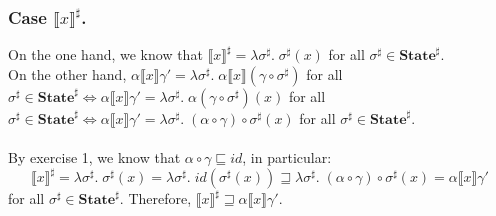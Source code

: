 \documentclass{article}
\newcommand{\sem}[1]{\llbracket #1 \rrbracket}
\newcommand{\state}{\textbf{State}}
\newcommand{\sgs}{\sigma^{\sharp}}
\newcommand{\ssx}[1]{\sem{#1}^{\sharp}}
\begin{document}
\subsubsection*{Case $\ssx{x}$.}
On the one hand, we know that $\ssx{x} = \lambda \sgs. \; \sgs(x)$ for all $\sgs \in \state^{\sharp}$.\\
On the other hand, $\alpha \sem{x} \gamma' = \lambda \sgs .\; \alpha \sem{x}\left(\gamma \circ \sgs\right)$ for all $\sgs \in \state^{\sharp} \iff \alpha \sem{x} \gamma' = \lambda \sgs. \; \alpha \left(\gamma \circ \sgs\right)(x)$ for all $\sgs \in \state^{\sharp} \iff \alpha \sem{x} \gamma' = \lambda \sgs. \; \left( \alpha \circ \gamma \right) \circ \sgs(x)$ for all $\sgs \in \state^{\sharp}$.\\\\
By exercise 1, we know that $\alpha \circ \gamma \sqsubseteq id$, in particular: $$\ssx{x} = \lambda \sgs. \; \sgs(x) = \lambda \sgs. \; id(\sgs(x)) \sqsupseteq \lambda \sgs. \; \left( \alpha \circ \gamma \right) \circ \sgs(x) = \alpha \sem{x} \gamma'$$ for all $\sgs \in \state^{\sharp}$. Therefore, $\ssx{x} \sqsupseteq \alpha \sem{x} \gamma'$.
\end{document}
